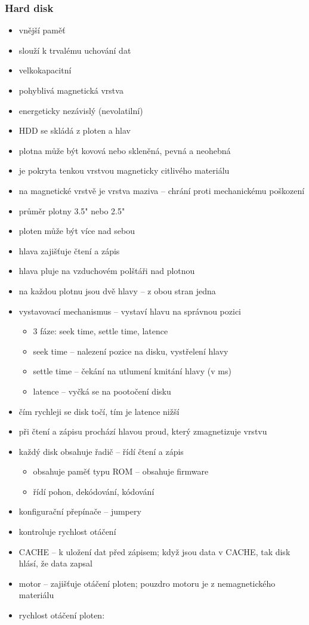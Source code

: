 \documentclass[a4paper,12pt]{article}
\providecommand{\tightlist}{%
\setlength{\itemsep}{0pt}\setlength{\parskip}{0pt}}
\begin{document}
\subsubsection{Hard disk}

\begin{itemize}
\tightlist
\item vnější paměť
\item slouží k trvalému uchování dat
\item velkokapacitní
\item pohyblivá magnetická vrstva
\item energeticky nezávislý (nevolatilní)
\item HDD se skládá z ploten a hlav
\item plotna může být kovová nebo skleněná, pevná a neohebná
\item je pokryta tenkou vrstvou magneticky citlivého materiálu
\item na magnetické vrstvě je vrstva maziva -- chrání proti mechanickému
  poškození
\item průměr plotny 3.5" nebo 2.5"
\item ploten může být více nad sebou
\item hlava zajišťuje čtení a zápis
\item hlava pluje na vzduchovém polštáři nad plotnou
\item na každou plotnu jsou dvě hlavy -- z obou stran jedna
\item vystavovací mechanismus -- vystaví hlavu na správnou pozici

  \begin{itemize}
  \tightlist
  \item 3 fáze: seek time, settle time, latence
  \item seek time -- nalezení pozice na disku, vystřelení hlavy
  \item settle time -- čekání na utlumení kmitání hlavy (v ms)
  \item latence -- vyčká se na pootočení disku
  \end{itemize}
\item čím rychleji se disk točí, tím je latence nižší
\item při čtení a zápisu prochází hlavou proud, který zmagnetizuje vrstvu
\item každý disk obsahuje řadič -- řídí čtení a zápis

  \begin{itemize}
  \tightlist
  \item obsahuje paměť typu ROM -- obsahuje firmware
  \item řídí pohon, dekódování, kódování
  \end{itemize}
\item konfigurační přepínače -- jumpery
\item kontroluje rychlost otáčení
\item CACHE -- k uložení dat před zápisem; když jsou data v CACHE, tak disk
  hlásí, že data zapsal
\item motor -- zajišťuje otáčení ploten; pouzdro motoru je z nemagnetického
  materiálu
\item rychlost otáčení ploten:


\end{itemize}
\end{document}
